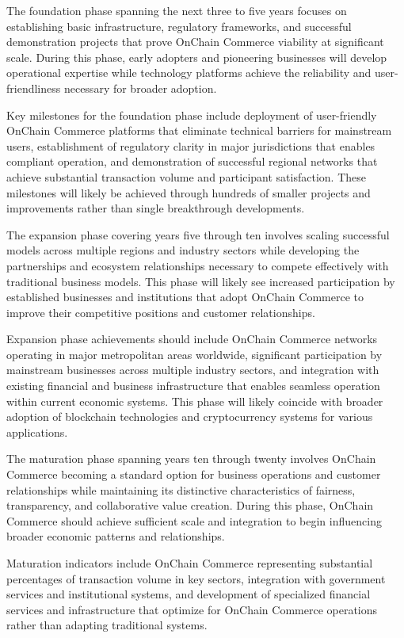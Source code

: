 \documentclass[
  Letterpaper,
]{scrbook}
\begin{document}
The foundation phase spanning the next three to five years focuses on
establishing basic infrastructure, regulatory frameworks, and successful
demonstration projects that prove OnChain Commerce viability at
significant scale. During this phase, early adopters and pioneering
businesses will develop operational expertise while technology platforms
achieve the reliability and user-friendliness necessary for broader
adoption.

Key milestones for the foundation phase include deployment of
user-friendly OnChain Commerce platforms that eliminate technical
barriers for mainstream users, establishment of regulatory clarity in
major jurisdictions that enables compliant operation, and demonstration
of successful regional networks that achieve substantial transaction
volume and participant satisfaction. These milestones will likely be
achieved through hundreds of smaller projects and improvements rather
than single breakthrough developments.

The expansion phase covering years five through ten involves scaling
successful models across multiple regions and industry sectors while
developing the partnerships and ecosystem relationships necessary to
compete effectively with traditional business models. This phase will
likely see increased participation by established businesses and
institutions that adopt OnChain Commerce to improve their competitive
positions and customer relationships.

Expansion phase achievements should include OnChain Commerce networks
operating in major metropolitan areas worldwide, significant
participation by mainstream businesses across multiple industry sectors,
and integration with existing financial and business infrastructure that
enables seamless operation within current economic systems. This phase
will likely coincide with broader adoption of blockchain technologies
and cryptocurrency systems for various applications.

The maturation phase spanning years ten through twenty involves OnChain
Commerce becoming a standard option for business operations and customer
relationships while maintaining its distinctive characteristics of
fairness, transparency, and collaborative value creation. During this
phase, OnChain Commerce should achieve sufficient scale and integration
to begin influencing broader economic patterns and relationships.

Maturation indicators include OnChain Commerce representing substantial
percentages of transaction volume in key sectors, integration with
government services and institutional systems, and development of
specialized financial services and infrastructure that optimize for
OnChain Commerce operations rather than adapting traditional systems.
\end{document}
